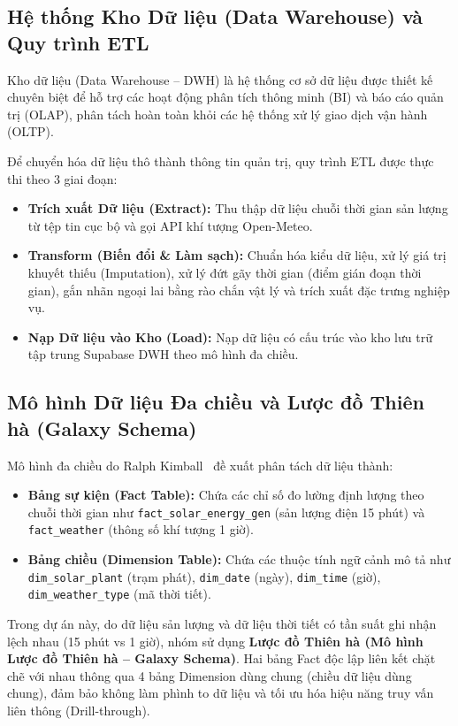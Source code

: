 \documentclass[12pt, a4paper]{report}
\begin{document}
\subsection{Hệ thống Kho Dữ liệu (Data Warehouse) và Quy trình ETL}
Kho dữ liệu (Data Warehouse -- DWH) là hệ thống cơ sở dữ liệu được thiết kế chuyên biệt để hỗ trợ các hoạt động phân tích thông minh (BI) và báo cáo quản trị (OLAP), phân tách hoàn toàn khỏi các hệ thống xử lý giao dịch vận hành (OLTP).

Để chuyển hóa dữ liệu thô thành thông tin quản trị, quy trình ETL được thực thi theo 3 giai đoạn:
\begin{itemize}[noitemsep]
    \item \textbf{Trích xuất Dữ liệu (Extract):} Thu thập dữ liệu chuỗi thời gian sản lượng từ tệp tin cục bộ và gọi API khí tượng Open-Meteo.
    \item \textbf{Transform (Biến đổi \& Làm sạch):} Chuẩn hóa kiểu dữ liệu, xử lý giá trị khuyết thiếu (Imputation), xử lý đứt gãy thời gian (điểm gián đoạn thời gian), gắn nhãn ngoại lai bằng rào chắn vật lý và trích xuất đặc trưng nghiệp vụ.
    \item \textbf{Nạp Dữ liệu vào Kho (Load):} Nạp dữ liệu có cấu trúc vào kho lưu trữ tập trung Supabase DWH theo mô hình đa chiều.
\end{itemize}

\subsection{Mô hình Dữ liệu Đa chiều và Lược đồ Thiên hà (Galaxy Schema)}
Mô hình đa chiều do Ralph Kimball~\cite{kimball2013dwh} đề xuất phân tách dữ liệu thành:
\begin{itemize}[noitemsep]
    \item \textbf{Bảng sự kiện (Fact Table):} Chứa các chỉ số đo lường định lượng theo chuỗi thời gian như \texttt{fact\_solar\_energy\_gen} (sản lượng điện 15 phút) và \texttt{fact\_weather} (thông số khí tượng 1 giờ).
    \item \textbf{Bảng chiều (Dimension Table):} Chứa các thuộc tính ngữ cảnh mô tả như \texttt{dim\_solar\_plant} (trạm phát), \texttt{dim\_date} (ngày), \texttt{dim\_time} (giờ), \texttt{dim\_weather\_type} (mã thời tiết).
\end{itemize}

Trong dự án này, do dữ liệu sản lượng và dữ liệu thời tiết có tần suất ghi nhận lệch nhau (15 phút vs 1 giờ), nhóm sử dụng \textbf{Lược đồ Thiên hà (Mô hình Lược đồ Thiên hà -- Galaxy Schema)}. Hai bảng Fact độc lập liên kết chặt chẽ với nhau thông qua 4 bảng Dimension dùng chung (chiều dữ liệu dùng chung), đảm bảo không làm phình to dữ liệu và tối ưu hóa hiệu năng truy vấn liên thông (Drill-through).
\end{document}
